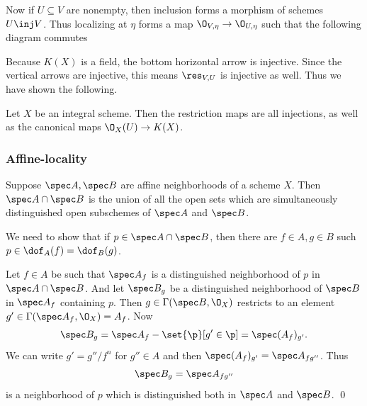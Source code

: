 Now if $U\subseteq V$ are nonempty, then inclusion forms a morphism of schemes $U\inj V$.
Thus localizing at $\eta$ forms a map $\O_{V,\eta}\to\O_{U,\eta}$ such that the following diagram commutes


Because $K(X)$ is a field, the bottom horizontal arrow is injective.
Since the vertical arrows are injective, this means $\res_{V,U}$ is injective as well.
Thus we have shown the following.

\bprop[name={intschinjmaps}]

    Let $X$ be an integral scheme.
    Then the restriction maps are all injections, as well as the canonical maps $\O_X(U)\to K(X)$.

\eprop

\subsubsection{Affine-locality}

\bprop[name={affineinter}]

    Suppose $\spec A,\spec B$ are affine neighborhoods of a scheme $X$.
    Then $\spec A\cap\spec B$ is the union of all the open sets which are simultaneously distinguished open subschemes of $\spec A$ and $\spec B$.

\eprop

\bproof

    We need to show that if $p\in\spec A\cap\spec B$, then there are $f\in A,g\in B$ such $p\in\dof_A(f)=\dof_B(g)$.

    Let $f\in A$ be such that $\spec A_f$ is a distinguished neighborhood of $p$ in $\spec A\cap\spec B$.
    And let $\spec B_g$ be a distinguished neighborhood of $\spec B$ in $\spec A_f$ containing $p$.
    Then $g\in\Gamma(\spec B,\O_X)$ restricts to an element $g'\in\Gamma(\spec A_f,\O_X)=A_f$.
    Now
    $$ \spec B_g = \spec A_f - \set{\p}[g'\in\p] = \spec (A_f)_{g'} . $$
    We can write $g'=g''/f^n$ for $g''\in A$ and then $\spec(A_f)_{g'}=\spec A_{fg''}$.
    Thus
    $$ \spec B_g = \spec A_{fg''} $$
    is a neighborhood of $p$ which is distinguished both in $\spec A$ and $\spec B$.
    \qed

